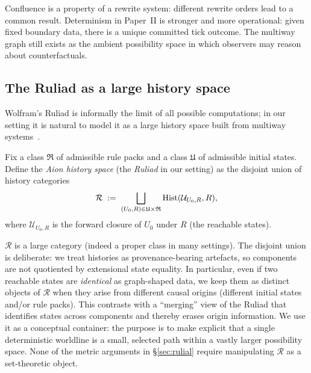 \documentclass{aion}
\newcommand{\Ruliad}{\mathcal{R}}
\begin{document}
\begin{remark}
Confluence is a property of a rewrite system: different rewrite orders lead to a common result.
Determinism in Paper~II is stronger and more operational: given fixed boundary data, there is a unique committed tick outcome.
The multiway graph still exists as the ambient possibility space in which observers may reason about counterfactuals.
\end{remark}

\subsection{The Ruliad as a large history space}
\label{subsec:ruliad}

Wolfram's Ruliad is informally the limit of all possible computations; in our setting it is natural to model it
as a large history space built from multiway systems~\cite{Wolfram2020}.

\begin{definition}\label{def:ruliad}
Fix a class $\mathfrak{R}$ of admissible rule packs and a class $\mathfrak{U}$ of admissible initial states.
Define the \emph{Aion history space} (the \emph{Ruliad} in our setting) as the disjoint union of history categories
\[
  \Ruliad \;:=\; \bigsqcup_{(U_0,R)\in\mathfrak{U}\times\mathfrak{R}} \Hist(\mathcal{U}_{U_0,R},R),
\]
where $\mathcal{U}_{U_0,R}$ is the forward closure of $U_0$ under $R$ (the reachable states).
\end{definition}

\begin{remark}
$\Ruliad$ is a large category (indeed a proper class in many settings).
The disjoint union is deliberate: we treat histories as provenance-bearing artefacts, so components are not quotiented by extensional
state equality.
In particular, even if two reachable states are \emph{identical} as graph-shaped data, we keep them as distinct objects of $\Ruliad$
when they arise from different causal origins (different initial states and/or rule packs).
This contrasts with a ``merging'' view of the Ruliad that identifies states across components and thereby erases origin information.
We use it as a conceptual container: the purpose is to make explicit that a single deterministic worldline is a small, selected path
within a vastly larger possibility space.
None of the metric arguments in \S\ref{sec:rulial} require manipulating $\Ruliad$ as a set-theoretic object.
\end{remark}
\end{document}

